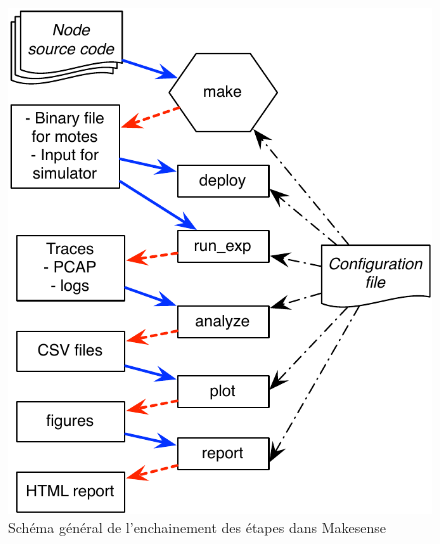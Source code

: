 \begin{figure}[tb]
  \centering
  \includegraphics[]{img/makesense_scheme.pdf}
  \caption{Schéma général de l'enchainement des étapes dans Makesense}
  \label{fig:makesense:schema}
\end{figure}

